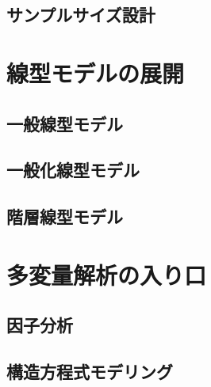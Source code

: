 \documentclass[
  a4paper,
]{ltjsbook}
\begin{document}
\section{サンプルサイズ設計}\label{ux30b5ux30f3ux30d7ux30ebux30b5ux30a4ux30baux8a2dux8a08}


\chapter{線型モデルの展開}\label{ux7ddaux578bux30e2ux30c7ux30ebux306eux5c55ux958b}

\section{一般線型モデル}\label{ux4e00ux822cux7ddaux578bux30e2ux30c7ux30eb}

\section{一般化線型モデル}\label{ux4e00ux822cux5316ux7ddaux578bux30e2ux30c7ux30eb}

\section{階層線型モデル}\label{ux968eux5c64ux7ddaux578bux30e2ux30c7ux30eb}


\chapter{多変量解析の入り口}\label{ux591aux5909ux91cfux89e3ux6790ux306eux5165ux308aux53e3}

\section{因子分析}\label{ux56e0ux5b50ux5206ux6790}

\section{構造方程式モデリング}\label{ux69cbux9020ux65b9ux7a0bux5f0fux30e2ux30c7ux30eaux30f3ux30b0}


\printbibliography[title=引用文献]
\end{document}
